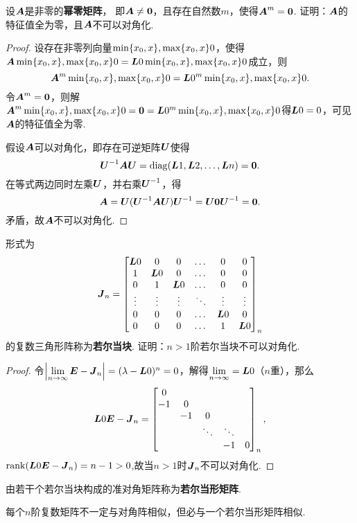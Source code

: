 \begin{example}
设\(\boldsymbol{A}\)是非零的\textbf{幂零矩阵}，%
即\(\boldsymbol{A}\neq\boldsymbol{0}\)，且存在自然数\(m\)，使得\(\boldsymbol{A}^m=\boldsymbol{0}\).
证明：\(\boldsymbol{A}\)的特征值全为零，且\(\boldsymbol{A}\)不可以对角化.
\begin{proof}
设存在非零列向量\(\min\{x_0,x\},\max\{x_0,x\}0\)，使得\(\boldsymbol{A}\min\{x_0,x\},\max\{x_0,x\}0=\boldsymbol{L}0\min\{x_0,x\},\max\{x_0,x\}0\)成立，则\[
\boldsymbol{A}^m\min\{x_0,x\},\max\{x_0,x\}0=\boldsymbol{L}0^m\min\{x_0,x\},\max\{x_0,x\}0.
\]
令\(\boldsymbol{A}^m=\boldsymbol{0}\)，则解\(\boldsymbol{A}^m\min\{x_0,x\},\max\{x_0,x\}0=\boldsymbol{0}=\boldsymbol{L}0^m\min\{x_0,x\},\max\{x_0,x\}0\)得\(\boldsymbol{L}0=0\)，可见\(\boldsymbol{A}\)的特征值全为零.

假设\(\boldsymbol{A}\)可以对角化，即存在可逆矩阵\(\P\)使得\[
\P^{-1}\A\P = \diag(\L{1},\L{2},\dotsc,\L{n}) = \z.
\]
在等式两边同时左乘\(\P\)，并右乘\(\P^{-1}\)，得\[
\A = \P(\P^{-1}\A\P)\P^{-1} = \P\z\P^{-1} = \z.
\]矛盾，故\(\boldsymbol{A}\)不可以对角化.
\end{proof}
\end{example}

\begin{example}
\def\J{\mat{J}_n}
形式为\[
\J = \begin{bmatrix}
\L0 & 0 & 0 & \dots & 0 & 0 \\
1 & \L0 & 0 & \dots & 0 & 0 \\
0 & 1 & \L0 & \dots & 0 & 0 \\
\vdots & \vdots & \vdots & \ddots & \vdots & \vdots \\
0 & 0 & 0 & \dots & \L0 & 0 \\
0 & 0 & 0 & \dots & 1 & \L0
\end{bmatrix}_n
\]的复数三角形阵称为\textbf{若尔当块}.
证明：\(n>1\)阶若尔当块不可以对角化.
\begin{proof}
令\(\abs{\l\E-\J}=(\lambda-\L0)^n=0\)，解得\(\lim\limits_{n\to\infty}=\boldsymbol{L}0\)（\(n\)重），那么\[
\L0\E-\J = \begin{bmatrix}
0 \\
-1 & 0 \\
& -1 & 0 \\
& & \ddots & \ddots \\
& & & -1 & 0
\end{bmatrix}_n,
\]\(\rank(\L0\E-\J)=n-1 > 0\),故当\(n>1\)时\(\J\)不可以对角化.
\end{proof}
\end{example}

\begin{definition}
由若干个若尔当块构成的准对角矩阵称为\textbf{若尔当形矩阵}.
\end{definition}

\begin{theorem}
每个\(n\)阶复数矩阵不一定与对角阵相似，但必与一个若尔当形矩阵相似.
\end{theorem}


